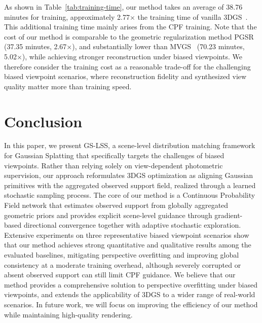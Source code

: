 \documentclass[lettersize,journal]{IEEEtran}
\begin{document}
As shown in Table~\ref{tab:training-time}, our method takes an average of 38.76 minutes for training, approximately 2.77$\times$ the training time of vanilla 3DGS~\cite{3dgs}.
This additional training time mainly arises from the CPF training. 
Note that the cost of our method is comparable to the geometric regularization method PGSR~\cite{pgsr} (37.35 minutes, 2.67$\times$), and substantially lower than MVGS~\cite{mvgs} (70.23 minutes, 5.02$\times$), while achieving stronger reconstruction under biased viewpoints. 
We therefore consider the training cost as a reasonable trade-off for the challenging biased viewpoint scenarios, where reconstruction fidelity and synthesized view quality matter more than training speed.



\section{Conclusion}

In this paper, we present GS-LSS, a scene-level distribution matching framework for Gaussian Splatting that specifically targets the challenges of biased viewpoints. Rather than relying solely on view-dependent photometric supervision, our approach reformulates 3DGS optimization as aligning Gaussian primitives with the aggregated observed support field, realized through a learned stochastic sampling process.
The core of our method is a Continuous Probability Field network that estimates observed support from globally aggregated geometric priors and provides explicit scene-level guidance through gradient-based directional convergence together with adaptive stochastic exploration. 
Extensive experiments on three representative biased viewpoint scenarios show that our method achieves strong quantitative and qualitative results among the evaluated baselines, mitigating perspective overfitting and improving global consistency at a moderate training overhead, although severely corrupted or absent observed support can still limit CPF guidance.
We believe that our method provides a comprehensive solution to perspective overfitting under biased viewpoints, and extends the applicability of 3DGS to a wider range of real-world scenarios. In future work, we will focus on improving the efficiency of our method while maintaining high-quality rendering. 
\end{document}
